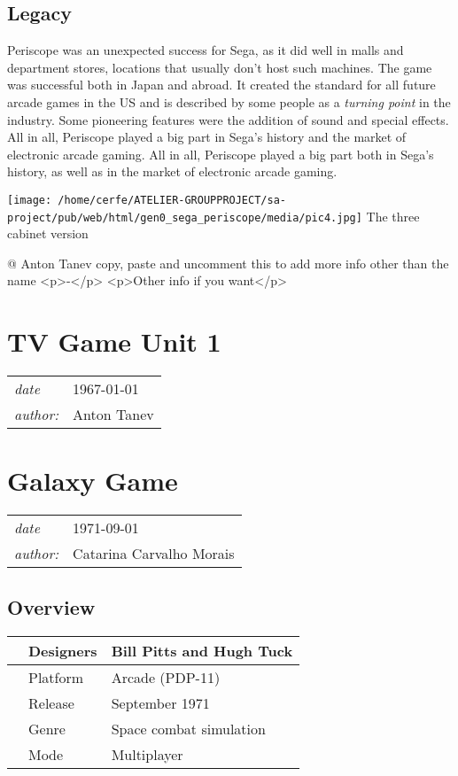 \documentclass[a4paper,10pt]{book}
\newcommand{\pageHeader}[4]{
    \section{#1}
    \vspace{-0.3cm}
    \begin{table}[h!]
     \begin{tabular}{ll}
        \hline
        \textit{date} & #2 \\
        \textit{author: } & #3\\
        \hline
     \end{tabular}
    \end{table}
    \vspace{-0.3cm}
}
\begin{document}
 
 \subsection{Legacy }
 
        Periscope was an unexpected success for Sega, as it did well in malls and department stores, locations that usually don't host such machines. The game
        was successful both in Japan and abroad. It created the standard for all future arcade games in the US and is described by some people as a  \textit{turning point }
        in the industry. Some pioneering features were the addition of sound and special effects. All in all, Periscope played a big part in Sega's history and the market of electronic arcade gaming.
         All in all, Periscope played a big part both in Sega's history, as well
        as in the market of electronic arcade gaming. 
 
 
 
 \texttt{[image: /home/cerfe/ATELIER-GROUPPROJECT/sa-project/pub/web/html/gen0\_sega\_periscope/media/pic4.jpg]}
 The three cabinet version 
 
 
 
 @ Anton Tanev 
  copy, paste and uncomment this to add more info other than the name
            <p>-</p>
            <p>Other info if you want</p>
           
 
 \newpage\pageHeader{TV Game Unit 1}{1967-01-01}{Anton Tanev}{The first of several video game test units for interactive games}\newpage\pageHeader{Galaxy Game}{1971-09-01}{Catarina Carvalho Morais}{Galaxy game, an arcade game created in 1971}
 \subsection{Overview }
 \begin{longtable}{p{1mm}|l|l|}\hline
 
 & Designers 
 & Bill Pitts and Hugh Tuck 
 \\\hline
 
 & Platform 
 & Arcade (PDP-11) 
 \\\hline
 
 & Release 
 & September 1971 
 \\\hline
 
 & Genre 
 & Space combat simulation 
 \\\hline
 
 & Mode 
 & Multiplayer 
 \\\hline
 \end{longtable}
 
\end{document}
